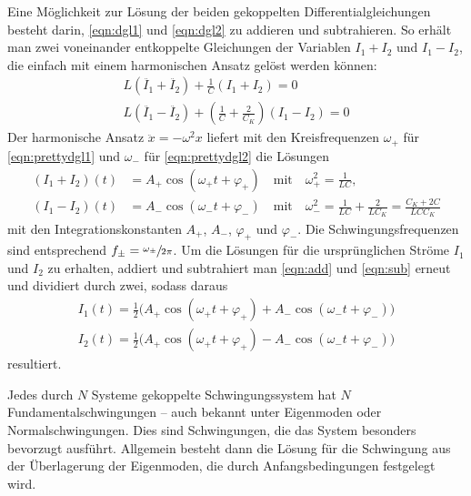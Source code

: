 Eine Möglichkeit zur Lösung der beiden gekoppelten Differentialgleichungen besteht darin, \eqref{eqn:dgl1} und \eqref{eqn:dgl2}
zu addieren und subtrahieren. So erhält man zwei voneinander entkoppelte Gleichungen der Variablen ${I_1 + I_2}$ und ${I_1 - I_2}$, 
die einfach mit einem harmonischen Ansatz gelöst werden können:
\begin{align}
    L (\ddot{I_1} + \ddot{I_2}) + \frac{1}{C} (I_1+I_2)=0 \label{eqn:prettydgl1} \\
    L (\ddot{I_1} - \ddot{I_2}) + (\frac{1}{C} + \frac{2}{C_K}) (I_1-I_2)=0 \label{eqn:prettydgl2}
\end{align}
Der harmonische Ansatz ${\ddot{x} = -\omega ^2 x}$ liefert mit den Kreisfrequenzen $\omega _+$ für \eqref{eqn:prettydgl1} 
und $\omega _-$ für \eqref{eqn:prettydgl2} die Lösungen 
\begin{align}
    (I_1+I_2)(t) &= A_+ \cos(\omega _+ t + \varphi _+) \quad \text{mit} \quad \omega _+ ^2= \frac{1}{LC} ,
    \label{eqn:add} \\
    (I_1-I_2)(t) &= A_- \cos(\omega _- t + \varphi _-) \quad \text{mit} \quad \omega _- ^2= \frac{1}{LC} + \frac{2}{LC_K} = \frac{C_K + 2C}{LCC_K} 
    \label{eqn:sub}
\end{align}
mit den Integrationskonstanten $A_+$, $A_-$, $\varphi _+$ und $\varphi _-$.
Die Schwingungsfrequenzen sind entsprechend $f_{\pm}=\sfrac{\omega _{\pm}}{2\pi}$.
Um die Lösungen für die ursprünglichen Ströme $I_1$ und $I_2$ zu erhalten, addiert und subtrahiert man \eqref{eqn:add} 
und \eqref{eqn:sub} erneut und dividiert durch zwei, sodass daraus 
\begin{align}
    I_1 (t) = \frac{1}{2} \bigl(A_+ \cos(\omega _+ t + \varphi _+) + A_- \cos(\omega _- t + \varphi _-)\bigr) \\
    I_2 (t) = \frac{1}{2} \bigl(A_+ \cos(\omega _+ t + \varphi _+) - A_- \cos(\omega _- t + \varphi _-)\bigr)
\end{align}
resultiert.

Jedes durch $N$ Systeme gekoppelte Schwingungssystem hat $N$ Fundamentalschwingungen -- auch bekannt unter Eigenmoden oder 
Normalschwingungen. 
Dies sind Schwingungen, die das System besonders \glqq bevorzugt\grqq{} ausführt. %
Allgemein besteht dann die Lösung für die Schwingung aus der Überlagerung der Eigenmoden, die durch Anfangsbedingungen 
festgelegt wird. 

